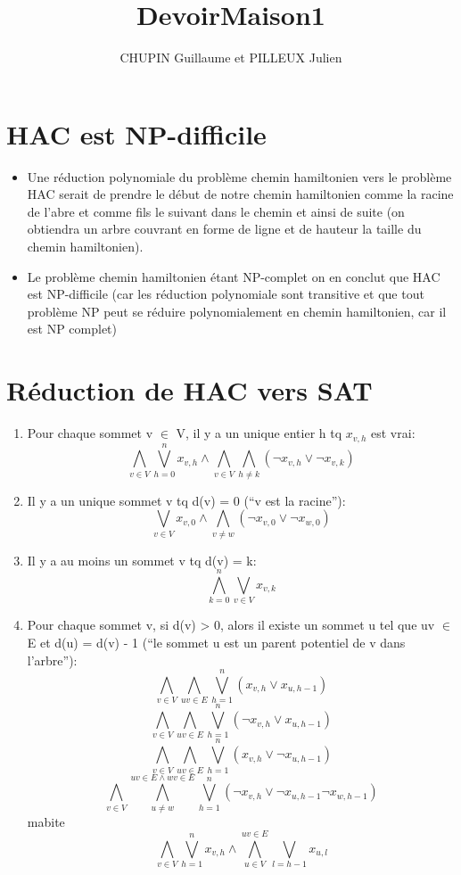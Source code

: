 \documentclass[10pt, a4paper]{article}
\title{DevoirMaison1}
\author {CHUPIN Guillaume et PILLEUX Julien}
\begin{document}
\maketitle
\thispagestyle {empty}
\newpage
\tableofcontents
\newpage

\section {HAC est NP-difficile}
\begin {itemize}
\item Une réduction polynomiale du problème chemin hamiltonien vers le problème HAC serait de prendre le début de notre chemin hamiltonien comme la racine de l'abre et comme fils le suivant dans le chemin et ainsi de suite (on obtiendra un arbre couvrant en forme de ligne et de hauteur la taille du chemin hamiltonien).
\item Le problème chemin hamiltonien étant NP-complet on en conclut que HAC est NP-difficile (car les réduction polynomiale sont transitive et que tout problème NP peut se réduire polynomialement en chemin hamiltonien, car il est NP complet)
\end {itemize}
\section {Réduction de HAC vers SAT}
\begin {enumerate}
\item Pour chaque sommet v $\in$ V, il y a un unique entier h tq $x_{v,h}$ est vrai:
  \[
  \bigwedge_{v \in V}\bigvee_{h=0}^nx_{v,h} \wedge\bigwedge_{v\in V}\bigwedge_{h\neq k}(\neg x_{v,h} \vee \neg x_{v,k})
  \]
\item Il y a un unique sommet v tq d(v) = 0 (``v est la racine''):
  \[
  \bigvee_{v\in V}x_{v,0} \wedge \bigwedge_{v\neq w}(\neg x_{v,0} \vee \neg x_{w,0})
  \]
\item Il y a au moins un sommet v tq d(v) = k:
  \[
  \bigwedge_{k=0}^{n}\bigvee_{v\in V}x_{v,k}
  \]
\item Pour chaque sommet v, si d(v) > 0, alors il existe un sommet u tel que uv $\in$ E et d(u) = d(v) - 1 (``le sommet u est un parent potentiel de v dans l'arbre''):
  \[
  \bigwedge_{v\in V}\bigwedge_{uv\in E}\bigvee_{h=1}^n(x_{v,h} \vee x_{u,h-1})
  \]
   \[
  \bigwedge_{v\in V}\bigwedge_{uv\in E}\bigvee_{h=1}^n(\neg x_{v,h} \vee x_{u,h-1})
  \]
   \[
  \bigwedge_{v\in V}\bigwedge_{uv\in E}\bigvee_{h=1}^n(x_{v,h} \vee \neg x_{u,h-1})
  \]
   \[
  \bigwedge_{v\in V}\bigwedge_{u\neq w}^{uv\in E \wedge wv\in E}\bigvee_{h=1}^n(\neg x_{v,h} \vee \neg x_{u,h-1} \neg x_{w,h-1})
  \]
  mabite
  \[
  \bigwedge_{v \in V}\bigvee_{h=1}^{n} x_{v,h} \wedge \bigwedge_{u \in V}^{uv \in E}\bigvee_{l=h-1} x_{u,l}
  \]
  
\end {enumerate}
\end{document}
